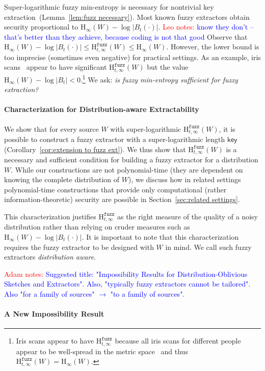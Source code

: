 \documentclass[11pt]{article}
\newcommand{\secref}[1]{\mbox{Section~\ref{#1}}}
\newcommand{\corref}[1]{\mbox{Corollary~\ref{#1}}}
\newcommand{\lemref}[1]{\mbox{Lemma~\ref{#1}}}
\newcommand{\class}[1]{{\ensuremath{\mathsf{#1}}}}
\newcommand{\key}{\ensuremath{\class{key}}\xspace}
\newcommand{\Hoo}{\mathrm{H}_\infty}
\newcommand{\Hfuzz}{\mathrm{H}^{\mathtt{fuzz}}_{t,\infty}}
\newcommand{\authnote}[2]{{\textcolor{red}{\textsf{#1 notes: }\textcolor{blue}{ #2}}\marginpar{\textcolor{red}{\textbf{!!!!!}}}}}
\newcommand{\authnote}[2]{}
\newcommand{\lnote}[1]{{\authnote{Leo}{#1}}}
\newcommand{\anote}[1]{{\authnote{Adam}{#1}}}
\begin{document}
Super-logarithmic fuzzy min-entropy  is necessary for nontrivial key extraction~(\lemref{lem:fuzz necessary}). 
Most known fuzzy extractors obtain security proportional to $\Hoo(W)-\log |B_t(\cdot)|$.  \lnote{know they don't -- that's better than they achieve, because coding is not that good}
Observe that $\Hoo(W)-\log |B_t(\cdot)| \le \Hfuzz(W) \le \Hoo(W)$.  However, the lower bound is too imprecise (sometimes even negative) for practical settings.  As an example, iris scans~\cite[Section 5]{blanton2009biometric} appear to have significant $\Hfuzz(W)$ but the value $\Hoo(W) -\log |B_t|<0$.\footnote{Iris scans appear to have $\Hfuzz$ because all iris scans for different people appear to be well-spread in the metric space~\cite{daugman2006probing} and thus $\Hfuzz(W) = \Hoo(W)$.}
We ask: \emph{is fuzzy min-entropy sufficient for fuzzy extraction?}


\paragraph{Characterization  for Distribution-aware Extractability}
We show that for every source $W$ with super-logarithmic $\Hfuzz(W)$, it is possible to construct a fuzzy extractor with a super-logarithmic length $\key$ (\corref{cor:extension to fuzz ext}). We thus show that $\Hfuzz(W)$ is a necessary and sufficient condition for building a fuzzy extractor for a distribution $W$.  While our constructions are not polynomial-time (they are dependent on knowing the complete distribution of $W$), we discuss  how in related settings polynomial-time constructions that provide only computational (rather information-theoretic) security are possible in \secref{sec:related settings}. 

This characterization justifies $\Hfuzz$ as the right measure of the quality of a noisy distribution rather than relying on cruder measures such as $\Hoo(W)-\log |B_t(\cdot)|$.
It is important to note that this characterization requires the fuzzy extractor to be designed with $W$ in mind. We call such fuzzy extractors \emph{distribution aware}.


\anote{Suggested title: "Impossibility Results for Distribution-Oblivious Sketches and Extractors". Also, "typically fuzzy extractors cannot be tailored". Also "for a family of sources" $\to$ "to a family of sources".}


\paragraph{A New Impossibility Result}
\end{document}
